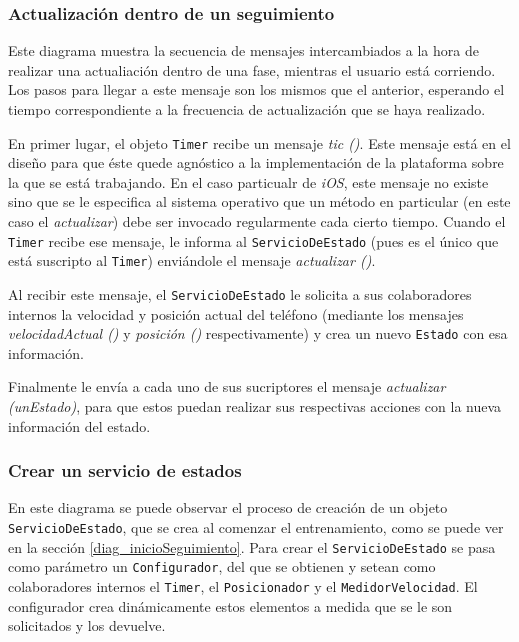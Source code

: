 \subsubsection{Actualización dentro de un seguimiento}
Este diagrama muestra la secuencia de mensajes intercambiados a la hora de realizar una actualiación dentro de una fase, mientras el usuario está corriendo. Los pasos para llegar a este mensaje son los mismos que el anterior, esperando el tiempo correspondiente a la frecuencia de actualización que se haya realizado.


En primer lugar, el objeto \texttt{Timer} recibe un mensaje \emph{tic ()}. Este mensaje está en el diseño para que éste quede agnóstico a la implementación de la plataforma sobre la que se está trabajando. En el caso particualr de \emph{iOS}, este mensaje no existe sino que se le especifica al sistema operativo que un método en particular (en este caso el \emph{actualizar}) debe ser invocado regularmente cada cierto tiempo. Cuando el \texttt{Timer} recibe ese mensaje, le informa al \texttt{ServicioDeEstado} (pues es el único que está suscripto al \texttt{Timer}) enviándole el mensaje \emph{actualizar ()}.


Al recibir este mensaje, el \texttt{ServicioDeEstado} le solicita a sus colaboradores internos la velocidad y posición actual del teléfono (mediante los mensajes \emph{velocidadActual ()} y \emph{posición ()} respectivamente) y crea un nuevo \texttt{Estado} con esa información.


Finalmente le envía a cada uno de sus sucriptores el mensaje \emph{actualizar (unEstado)}, para que estos puedan realizar sus respectivas acciones con la nueva información del estado. 

\subsubsection{Crear un servicio de estados}\label{diag_crearUnServicioDeEstado}
En este diagrama se puede observar el proceso de creación de un objeto \texttt{ServicioDeEstado}, que se crea al comenzar el entrenamiento, como se puede ver en la sección \ref{diag_inicioSeguimiento}. Para crear el \texttt{ServicioDeEstado}
 se pasa como parámetro un \texttt{Configurador}, del que se obtienen y setean como colaboradores internos el \texttt{Timer}, el \texttt{Posicionador} y el \texttt{MedidorVelocidad}. El configurador crea dinámicamente estos elementos a medida que se le son solicitados y los devuelve.

